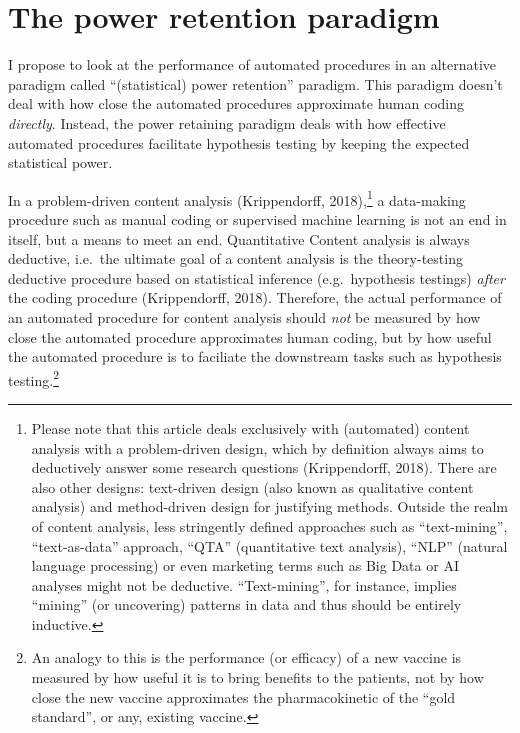 \documentclass[english,man,floatsintext]{apa6}
\begin{document}
\hypertarget{the-power-retention-paradigm}{%
\section{The power retention paradigm}\label{the-power-retention-paradigm}}

I propose to look at the performance of automated procedures in an alternative paradigm called \enquote{(statistical) power retention} paradigm. This paradigm doesn't deal with how close the automated procedures approximate human coding \emph{directly}. Instead, the power retaining paradigm deals with how effective automated procedures facilitate hypothesis testing by keeping the expected statistical power.

In a problem-driven content analysis (Krippendorff, 2018),\footnote{Please note that this article deals exclusively with (automated) content analysis with a problem-driven design, which by definition always aims to deductively answer some research questions (Krippendorff, 2018). There are also other designs: text-driven design (also known as qualitative content analysis) and method-driven design for justifying methods. Outside the realm of content analysis, less stringently defined approaches such as \enquote{text-mining}, \enquote{text-as-data} approach, \enquote{QTA} (quantitative text analysis), \enquote{NLP} (natural language processing) or even marketing terms such as Big Data or AI analyses might not be deductive. \enquote{Text-mining}, for instance, implies \enquote{mining} (or uncovering) patterns in data and thus should be entirely inductive.} a data-making procedure such as manual coding or supervised machine learning is not an end in itself, but a means to meet an end. Quantitative Content analysis is always deductive, i.e.~the ultimate goal of a content analysis is the theory-testing deductive procedure based on statistical inference (e.g.~hypothesis testings) \emph{after} the coding procedure (Krippendorff, 2018). Therefore, the actual performance of an automated procedure for content analysis should \emph{not} be measured by how close the automated procedure approximates human coding, but by how useful the automated procedure is to faciliate the downstream tasks such as hypothesis testing.\footnote{An analogy to this is the performance (or efficacy) of a new vaccine is measured by how useful it is to bring benefits to the patients, not by how close the new vaccine approximates the pharmacokinetic of the \enquote{gold standard}, or any, existing vaccine.}
\end{document}
